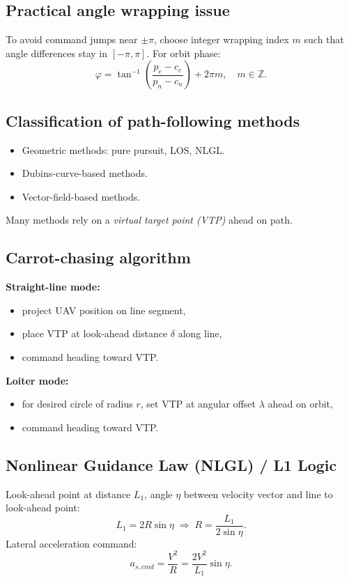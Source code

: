 \documentclass[11pt,a4paper]{article}
\begin{document}
\subsection{Practical angle wrapping issue}
To avoid command jumps near $\pm\pi$, choose integer wrapping index $m$ such that angle differences stay in $[-\pi,\pi]$.
For orbit phase:
\[
\varphi=\tan^{-1}\!\left(\frac{p_e-c_e}{p_n-c_n}\right)+2\pi m,\quad m\in\mathbb{Z}.
\]

\subsection{Classification of path-following methods}
\begin{itemize}
  \item Geometric methods: pure pursuit, LOS, NLGL.
  \item Dubins-curve-based methods.
  \item Vector-field-based methods.
\end{itemize}
Many methods rely on a \emph{virtual target point (VTP)} ahead on path.

\subsection{Carrot-chasing algorithm}
\textbf{Straight-line mode:}
\begin{itemize}
  \item project UAV position on line segment,
  \item place VTP at look-ahead distance $\delta$ along line,
  \item command heading toward VTP.
\end{itemize}
\textbf{Loiter mode:}
\begin{itemize}
  \item for desired circle of radius $r$, set VTP at angular offset $\lambda$ ahead on orbit,
  \item command heading toward VTP.
\end{itemize}

\subsection{Nonlinear Guidance Law (NLGL) / L1 Logic}
Look-ahead point at distance $L_1$, angle $\eta$ between velocity vector and line to look-ahead point:
\[
L_1=2R\sin\eta \;\Rightarrow\; R=\frac{L_1}{2\sin\eta}.
\]
Lateral acceleration command:
\[
a_{s,cmd}=\frac{V^2}{R}=\frac{2V^2}{L_1}\sin\eta.
\]
\end{document}
